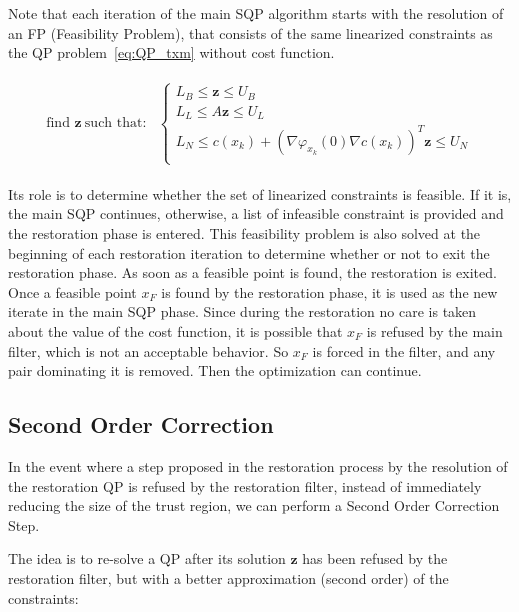 Note that each iteration of the main SQP algorithm starts with the resolution of an FP (Feasibility Problem), that consists of the same linearized constraints as the QP problem~\ref{eq:QP_txm} without cost function.

\begin{align}
  \label{eq:FP_txm}
  \begin{split}
  \text{find } \mathbf{z}\ \text{such that:}&\left\{
  \begin{array}{lr}
    L_B \leq \mathbf{z} \leq U_B \\
    L_L \leq A \mathbf{z} \leq U_L \\
    L_N \leq c(x_k) + {\left(\nabla\varphi_{x_k}(0) \nabla c (x_k)\right)}^T\mathbf{z}\leq U_N\\
  \end{array}\right.
  \end{split}
\end{align}

Its role is to determine whether the set of linearized constraints is feasible.
If it is, the main SQP continues, otherwise, a list of infeasible constraint is provided and the restoration phase is entered.
This feasibility problem is also solved at the beginning of each restoration iteration to determine whether or not to exit the restoration phase. As soon as a feasible point is found, the restoration is exited.
Once a feasible point $x_F$ is found by the restoration phase, it is used as the new iterate in the main SQP phase.
Since during the restoration no care is taken about the value of the cost function, it is possible that $x_F$ is refused by the main filter, which is not an acceptable behavior.
So $x_F$ is forced in the filter, and any pair dominating it is removed.
Then the optimization can continue.

\subsection{Second Order Correction}
\label{sub:second_order_correction}

In the event where a step proposed in the restoration process by the resolution of the restoration QP is refused by the restoration filter, instead of immediately reducing the size of the trust region, we can perform a Second Order Correction Step.

The idea is to re-solve a QP after its solution $\mathbf{z}$ has been refused by the restoration filter, but with a better approximation (second order) of the constraints:

